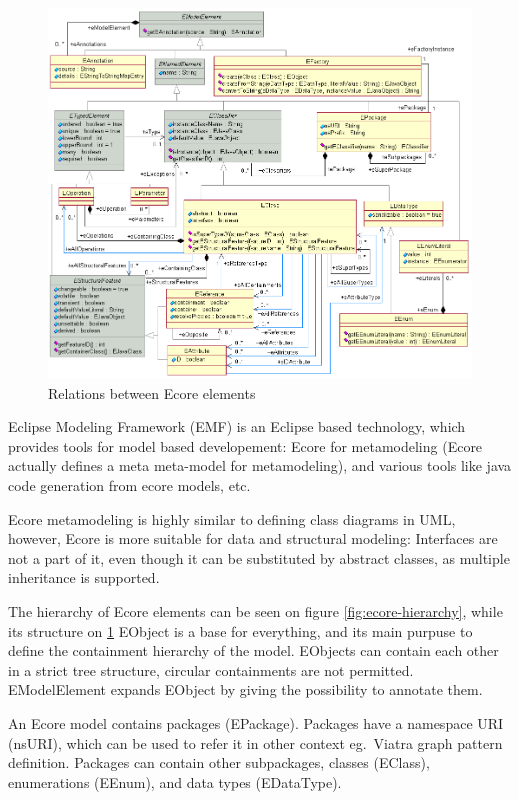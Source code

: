 \begin{figure}
	\begin{center}
		\includegraphics[width=\textwidth]{figures/EcoreRelations.png}
		\caption{Relations between Ecore elements \cite{ecore-package} }
		\label{fig:ecore-relations}
	\end{center}
\end{figure}

Eclipse Modeling Framework (EMF) is an Eclipse based technology, which provides tools for model based developement: 
Ecore \cite{ecore-package} for metamodeling (Ecore actually defines a meta meta-model for metamodeling), and various tools like java code generation from ecore models, etc.

Ecore metamodeling is highly similar to defining class diagrams in UML, however, 
Ecore is more suitable for data and structural modeling: Interfaces are not a part of it, even though it can be substituted by abstract classes, as multiple inheritance is supported.

The hierarchy of Ecore elements can be seen on figure \ref{fig:ecore-hierarchy}, while its structure on \ref{fig:ecore-relations}
EObject is a base for everything, and its main purpuse to define the containment hierarchy of the model. 
EObjects can contain each other in a strict tree structure, circular containments are not permitted.
EModelElement expands EObject by giving the possibility to annotate them.

An Ecore model contains packages (EPackage). 
Packages have a namespace URI (nsURI), which can be used to refer it in other context eg.\ Viatra graph pattern definition.
Packages can contain other subpackages, classes (EClass), enumerations (EEnum), and data types (EDataType).

